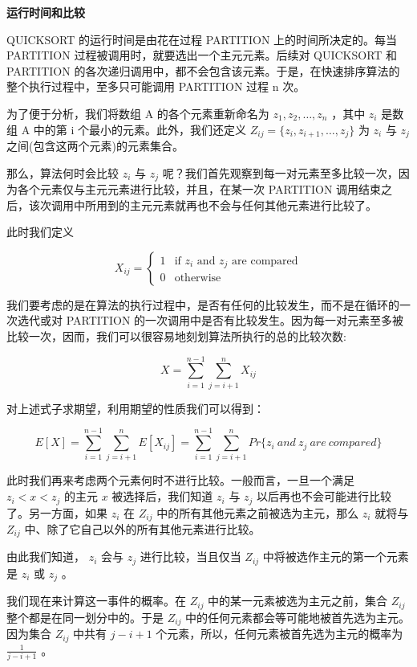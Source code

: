 \documentclass{article}
\begin{document}
\textbf{运行时间和比较}

QUICKSORT 的运行时间是由花在过程 PARTITION 上的时间所决定的。每当 PARTITION 过程被调用时，就要选出一个主元元素。后续对 QUICKSORT 和 PARTITION 的各次递归调用中，都不会包含该元素。于是，在快速排序算法的整个执行过程中，至多只可能调用 PARTITION 过程 n 次。

为了便于分析，我们将数组 A 的各个元素重新命名为 $z_1,z_2,\dots,z_n$ ，其中 $z_i$ 是数组 A 中的第 i 个最小的元素。此外，我们还定义 $Z_{ij} = \{z_i,z_{i+1},\dots,z_j\}$ 为 $z_i$ 与 $z_j$ 之间(包含这两个元素)的元素集合。

那么，算法何时会比较 $z_i$ 与 $z_j$ 呢？我们首先观察到每一对元素至多比较一次，因为各个元素仅与主元元素进行比较，并且，在某一次 PARTITION 调用结束之后，该次调用中所用到的主元元素就再也不会与任何其他元素进行比较了。

此时我们定义 

$$X_{ij} = \begin{cases} 1 & \text{if } z_i \text{ and } z_j \text{ are compared} \\ 0 & \text{otherwise} \end{cases}$$

我们要考虑的是在算法的执行过程中，是否有任何的比较发生，而不是在循环的一次选代或对 PARTITION 的一次调用中是否有比较发生。因为每一对元素至多被比较一次，因而，我们可以很容易地刻划算法所执行的总的比较次数:

$$X = \sum\limits_{i=1}^{n-1}\sum\limits_{j=i+1}^{n}X_{ij}$$

对上述式子求期望，利用期望的性质我们可以得到：

$$E[X] = \sum\limits_{i=1}^{n-1}\sum\limits_{j=i+1}^{n}E[X_{ij}] = \sum\limits_{i=1}^{n-1}\sum\limits_{j=i+1}^{n}Pr\{z_i \ and \ z_j \ are \ compared\}$$

此时我们再来考虑两个元素何时不进行比较。一般而言，一旦一个满足 $z_i < x < z_j$ 的主元 $x$ 被选择后，我们知道 $z_i$ 与 $z_j$ 以后再也不会可能进行比较了。另一方面，如果 $z_i$ 在 $Z_{ij}$ 中的所有其他元素之前被选为主元，那么 $z_i$ 就将与 $Z_{ij}$ 中、除了它自己以外的所有其他元素进行比较。

由此我们知道， $z_i$ 会与 $z_j$ 进行比较，当且仅当 $Z_{ij}$ 中将被选作主元的第一个元素是 $z_i$ 或 $z_j$ 。

我们现在来计算这一事件的概率。在 $Z_{ij}$ 中的某一元素被选为主元之前，集合 $Z_{ij}$ 整个都是在同一划分中的。于是 $Z_{ij}$ 中的任何元素都会等可能地被首先选为主元。因为集合 $Z_{ij}$ 中共有 $j-i+1$ 个元素，所以，任何元素被首先选为主元的概率为 $\frac{1}{j-i+1}$ 。
\end{document}
